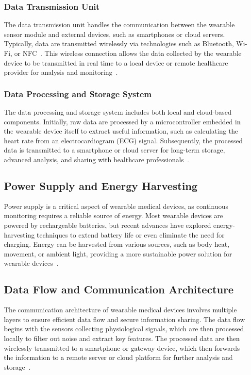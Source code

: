 \documentclass[journal]{IEEEtran}
\begin{document}
        \subsubsection{Data Transmission Unit}
        The data transmission unit handles the communication between the wearable sensor module and external devices, such as smartphones or cloud servers. Typically, data are transmitted wirelessly via technologies such as Bluetooth, Wi-Fi, or NFC~\cite{Guk2019}. This wireless connection allows the data collected by the wearable device to be transmitted in real time to a local device or remote healthcare provider for analysis and monitoring~\cite{Nahavandi2022}.

        \subsubsection{Data Processing and Storage System}
        The data processing and storage system includes both local and cloud-based components. Initially, raw data are processed by a microcontroller embedded in the wearable device itself to extract useful information, such as calculating the heart rate from an electrocardiogram (ECG) signal. Subsequently, the processed data is transmitted to a smartphone or cloud server for long-term storage, advanced analysis, and sharing with healthcare professionals~\cite{Veeravalli2017}.

    \subsection{Power Supply and Energy Harvesting}
    Power supply is a critical aspect of wearable medical devices, as continuous monitoring requires a reliable source of energy. Most wearable devices are powered by rechargeable batteries, but recent advances have explored energy-harvesting techniques to extend battery life or even eliminate the need for charging. Energy can be harvested from various sources, such as body heat, movement, or ambient light, providing a more sustainable power solution for wearable devices~\cite{Ates2022}.

    \subsection{Data Flow and Communication Architecture}
    The communication architecture of wearable medical devices involves multiple layers to ensure efficient data flow and secure information sharing. The data flow begins with the sensors collecting physiological signals, which are then processed locally to filter out noise and extract key features. The processed data are then wirelessly transmitted to a smartphone or gateway device, which then forwards the information to a remote server or cloud platform for further analysis and storage~\cite{Saifuzzaman2021}.
\end{document}
